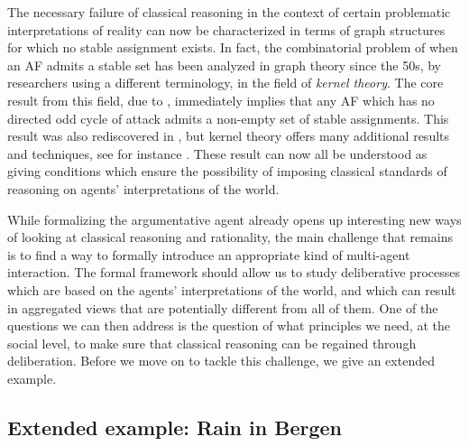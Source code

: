 \documentclass[greybox]{svmult}
\begin{document}
The necessary failure of classical reasoning in the context of certain problematic interpretations of reality can now be characterized in terms of graph structures for which no stable assignment exists. 
In fact, the combinatorial problem of when an AF admits a stable set has been analyzed in graph theory since the 50s, by researchers using a different terminology, in the field of \emph{kernel theory}. The core result from this field, due to \cite{richardson}, immediately implies that any AF which has no directed odd cycle of attack admits a non-empty set of stable assignments. This result was also rediscovered in \cite{dung}, but kernel theory offers many additional results and techniques, see for instance \cite{sanches}. These result can now all be understood as giving conditions which ensure the possibility of imposing classical standards of reasoning on agents' interpretations of the world.

While formalizing the argumentative agent already opens up interesting new ways of looking at classical reasoning and rationality, the main challenge that remains is to find a way to formally introduce an appropriate kind of multi-agent interaction. The formal framework should allow us to study deliberative processes which are based on the agents' interpretations of the world, and which can result in aggregated views that are potentially different from all of them. One of the questions we can then address is the question of what principles we need, at the social level, to make sure that classical reasoning can be regained through deliberation. Before we move on to tackle this challenge, we give an extended example.

\subsection{Extended example: Rain in Bergen}\label{ex:run}
\end{document}
